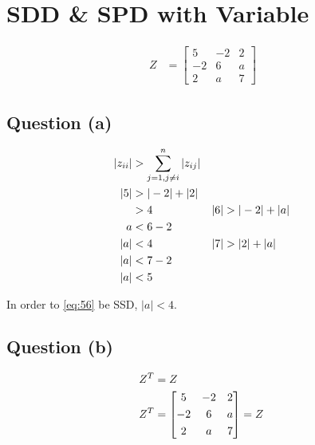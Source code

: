 \section{SDD \& SPD with Variable}
	\begin{align}
		Z &= \begin{bmatrix}
				5 & -2 & 2 \\[0.3em]
				-2 & 6 & a \\[0.3em]
				2 & a & 7
			\end{bmatrix}&
	\label{eq:56}
	\end{align}

	\subsection{Question (a)}

		\begin{align}
			\left|z_{ii}\right| &> \sum_{j=1,j \neq i}^{n} \left|z_{ij}\right|& \\
			|5| &> |-2| + |2|& \notag \\
			&> 4 &
			|6| &> |-2| + |a|& \notag \\
			a &< 6 - 2& \notag \\
			|a| &< 4&
			|7| &> |2| + |a|& \notag \\
			|a| &< 7 - 2& \notag \\
			|a| &< 5&
			\label{eq:56a}
		\end{align}

		In order to \cref{eq:56} be SSD, $|a| < 4$.

	\subsection{Question (b)}
		\begin{align}
			Z^{T} &= Z& \notag \\
			Z^{T} &= \begin{bmatrix}
					5 & -2 & 2 \\[0.3em]
					-2 & 6 & a \\[0.3em]
					2 & a & 7
				\end{bmatrix} = Z&
		\label{eq:56zt}
		\end{align}

